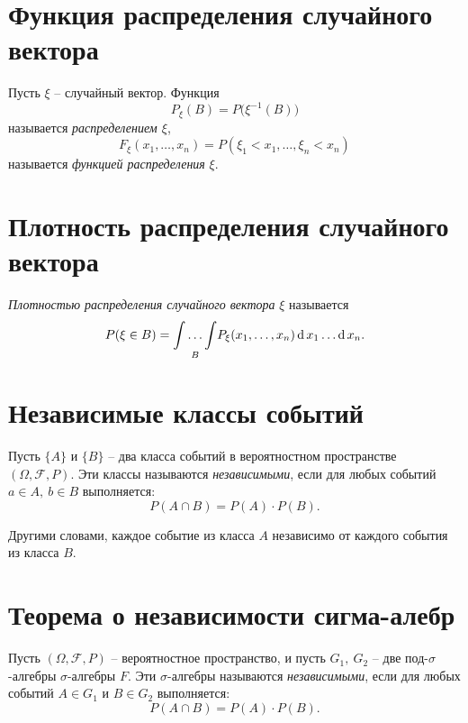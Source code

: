 \section{Функция распределения случайного вектора}

\begin{definition}
	Пусть $\xi $ -- случайный вектор. Функция
	\[
		P_{\xi } (B) = P \big(\xi^{-1} (B)\big)
	\]
	называется \emph{распределением $\xi $},
	\[
		F_{\xi } (x_1,\ldots ,x_n) = P(\xi _1 < x_1, \ldots , \xi _n < x_n)
	\]
	называется \emph{функцией распределения} $\xi $.
\end{definition}

\newpage

\section{Плотность распределения случайного вектора}

\begin{definition}
	\emph{Плотностью распределения случайного вектора} $\xi $ называется
	\[
		P(\xi \in B) = \underset{B}{\int \ldots \int} P_{\xi } (x_1,\ldots ,x_n)\operatorname{d} x_1 \ldots \operatorname{d} x_n.
	\]
\end{definition}

\section{Независимые классы событий}

\begin{definition}
	Пусть $\{A\}$ и $\{B\}$ -- два класса событий в вероятностном пространстве $(\Omega , \mathcal{F}, P)$. Эти классы называются \emph{независимыми}, если для любых событий $a \in A, \ b \in B$ выполняется:
	\[
		P(A \cap B) = P(A)\cdot P(B).
	\]

	Другими словами, каждое событие из класса $A$ независимо от каждого события из класса $B$.
\end{definition}

\section{Теорема о независимости сигма-алебр}

\begin{theorem}
	Пусть $(\Omega , \mathcal{F}, P)$ -- вероятностное пространство, и пусть $G_1, \ G_2$ -- две под-$\sigma $-алгебры $\sigma $-алгебры $F$. Эти $\sigma $-алгебры называются \emph{независимыми}, если для любых событий $A \in G_1$ и $B \in G_2$ выполняется:
	\[
		P(A \cap B) = P(A) \cdot P(B).
	\]
\end{theorem}


